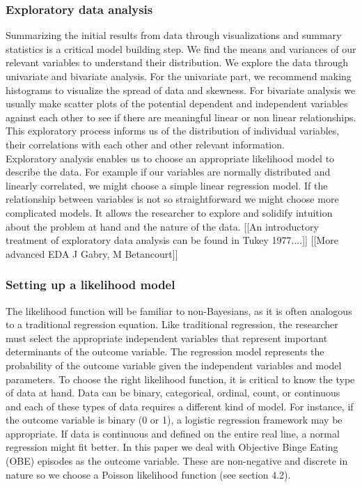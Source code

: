 \documentclass{article}
\begin{document}
\subsubsection{Exploratory data analysis}
Summarizing the initial results from data through visualizations and summary statistics is a critical model building step. We find the means and variances of our relevant variables to understand their distribution. We explore the data through univariate and bivariate analysis. For the univariate part, we recommend making histograms to visualize the spread of data and skewness. For bivariate analysis we usually make scatter plots of the potential dependent and independent variables against each other to see if there are meaningful linear or non linear relationships. This exploratory process informs us of the distribution of individual variables, their correlations with each other and other relevant information. \\
Exploratory analysis enables us to choose an appropriate likelihood model to describe the data. For example if our variables are normally distributed and linearly correlated, we might choose a simple linear regression model. If the relationship between variables is not so straightforward we might choose more complicated models.  It allows the researcher to explore and solidify intuition about the problem at hand and the nature of the data. [[An introductory treatment of exploratory data analysis can be found in Tukey 1977....]] [[More advanced EDA J Gabry, M Betancourt]]


\subsubsection{Setting up a likelihood model}
The likelihood function will be familiar to non-Bayesians, as it is often analogous to a traditional regression equation. Like traditional regression, the researcher must select the appropriate independent variables that represent important determinants of the outcome variable. The regression model represents the probability of the outcome variable given the independent variables and model parameters. To choose the right likelihood function, it is critical to know the type of data at hand. Data can be binary, categorical, ordinal, count, or continuous and each of these types of data requires a different kind of model.  For instance, if the outcome variable is binary (0 or 1), a logistic regression framework may be appropriate. If data is continuous and defined on the entire real line, a normal regression might fit better. In this paper we deal with Objective Binge Eating (OBE) episodes as the outcome variable. These are non-negative and discrete in nature so we choose a Poisson likelihood function (see section 4.2). 
 
\end{document}
